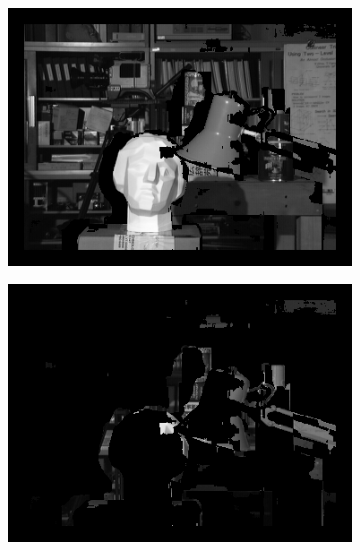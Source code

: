 \documentclass[letterpaper,12pt]{article}
\begin{document}
\begin{figure}[!h]
\begin{subfigure}[b]{0.30\textwidth}
         \end{subfigure}
         \\
        \begin{subfigure}[b]{0.30\textwidth}
                \includegraphics[width=\textwidth]{correct-tsukubaO.png}

        \end{subfigure}%
        \quad
        \begin{subfigure}[b]{0.30\textwidth}
                \includegraphics[width=\textwidth]{icorrect-tsukubaO.png}


\end{subfigure}
\end{figure}
\end{document}

